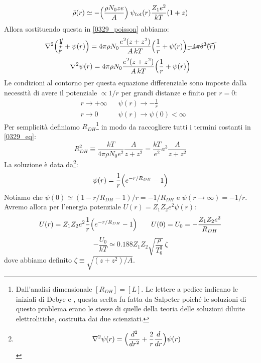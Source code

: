 \begin{equation}\label{0329_rho}
    \bar{\rho} (r) \simeq - \Bigl ( \frac{\rho N_0ze}{A} \Bigr )\: \psi_{tot}(r) \frac{Z_1e^2}{kT} (1+z)
\end{equation}
Allora sostituendo questa in \eqref{0329_poisson} abbiamo:
$$\nabla^2 \Bigl ( \cancel{\frac{1}{r}} + \psi(r) \Bigr ) = 4\pi \rho N_0 \frac{e^2(z+z^2)}{A\, kT}  \Bigl ( \frac{1}{r} +\psi(r) \Bigr ) \cancel{-4\pi \delta^3(r)}$$
\begin{equation}\label{0329_eq}
    \nabla^2 \psi(r) = 4\pi \rho N_0 \frac{e^2(z+z^2)}{A\, kT}  \Bigl ( \frac{1}{r} +\psi(r) \Bigr )
\end{equation}
Le condizioni al contorno per questa equazione differenziale sono imposte dalla necessità di avere il potenziale $\propto 1/r$ per grandi distanze e finito per $r=0$:
\begin{displaymath}
\begin{aligned}
&r\to +\infty & &\psi(r) \to -\frac{1}{r}\\
&r\to 0 & &\psi(r) \to \psi(0)<\infty
\end{aligned}
\end{displaymath}
Per semplicità definiamo $R_{DH}$\footnote{Dall'analisi dimensionale $[R_{DH}] = [L]$. Le lettere a pedice indicano le iniziali di Debye e \Huckel{}, questa scelta fu fatta da Salpeter poiché le soluzioni di questo problema erano le stesse di quelle della teoria delle soluzioni diluite elettrolitiche, costruita dai due scienziati.} in modo da raccogliere tutti i termini costanti in \eqref{0329_eq}:
$$R_{DH}^2 \equiv \frac{kT}{4\pi \rho N_0e^2} \frac{A}{z+z^2} = \frac{kT}{e^2} a^3 \frac{A}{z+z^2}$$
La soluzione è data da\footnote{$$\nabla^2 \psi(r) = \Bigl ( \frac{d^2}{dr^2} + \frac{2}{r}\frac{d}{dr} \Bigr )\psi(r)$$}:
$$\psi(r) = \frac{1}{r}\Bigl ( e^{-r/R_{DH}}-1 \Bigr )$$
Notiamo che $\psi(0)\simeq (1-r/R_{DH}-1)/r=-1/R_{DH}$ e $\psi(r\to\infty)=-1/r$. Avremo allora per l'energia potenziale $U(r) = Z_1Z_2 e^2 \psi(r)$:
$$U(r) = Z_1Z_2 e^2 \frac{1}{r} \Bigl ( e^{-r/R_{DH}}-1 \Bigr ) \qquad U(0)=U_0 = -\frac{Z_1Z_2 e^2}{R_{DH}}$$
\begin{equation}\label{0329_U0}
-\frac{U_0}{kT}\simeq 0.188 Z_1Z_2 \sqrt{\frac{\rho}{T_6^3}}\,\zeta
\end{equation}
dove abbiamo definito $\zeta\equiv \sqrt{(z+z^2)/A}$.

